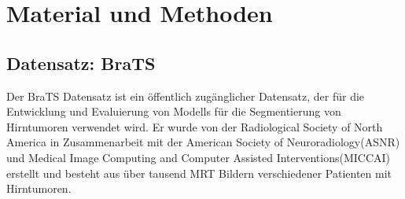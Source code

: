\chapter{Material und Methoden}
\section{Datensatz: \ac{BraTS}}
\label{sec:Datensatz}
Der \ac{BraTS} Datensatz ist ein öffentlich zugänglicher Datensatz, der für die Entwicklung und Evaluierung von \glspl{Modell} für die Segmentierung von Hirntumoren verwendet wird. Er wurde von der Radiological Society of North America in Zusammenarbeit mit der American Society of Neuroradiology(ASNR) und Medical Image Computing and Computer Assisted Interventions(MICCAI) erstellt und besteht aus über tausend \ac{MRT} Bildern verschiedener Patienten mit Hirntumoren. \cite[vgl.][]{RSNABrainTumor2021}

